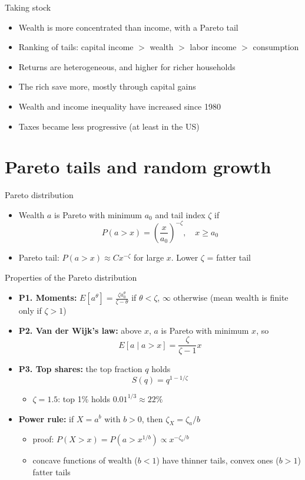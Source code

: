 \documentclass[10pt,english,10pt,handout]{beamer}
\begin{document}
\begin{frame}{Taking stock}
\begin{itemize}
\item Wealth is more concentrated than income, with a Pareto tail
\item Ranking of tails: capital income $>$ wealth $>$ labor income $>$ consumption
\item Returns are heterogeneous, and higher for richer households
\item The rich save more, mostly through capital gains
\item Wealth and income inequality have increased since 1980
\item Taxes became less progressive (at least in the US)
\end{itemize}
\end{frame}

\section[Pareto tails]{Pareto tails and random growth}

\begin{frame}{Pareto distribution}
\begin{itemize}
\item Wealth $a$ is Pareto with minimum $a_{0}$ and tail index $\zeta$ if
\[
P\left(a>x\right)=\left(\frac{x}{a_{0}}\right)^{-\zeta},\quad x\geq a_{0}
\]
\item Pareto tail: $P(a>x)\approx Cx^{-\zeta}$ for large $x$. Lower $\zeta$ = fatter tail

\end{itemize}
\end{frame}

\begin{frame}{Properties of the Pareto distribution}
\begin{itemize}
\item \textbf{P1. Moments:} $E\left[a^{\theta}\right]=\frac{\zeta a_{0}^{\theta}}{\zeta-\theta}$ if $\theta<\zeta$, $\infty$ otherwise (mean wealth is finite only if $\zeta>1$)
\item \textbf{P2. Van der Wijk's law:} above $x$, $a$ is Pareto with minimum $x$, so
\[
E\left[a\mid a>x\right]=\frac{\zeta}{\zeta-1}x
\]
\item \textbf{P3. Top shares:} the top fraction $q$ holds
\[
S(q)=q^{1-1/\zeta}
\]
\begin{itemize}
\item $\zeta=1.5$: top 1\% holds $0.01^{1/3}\approx22\%$
\end{itemize}
\item \textbf{Power rule:} if $X=a^{b}$ with $b>0$, then $\zeta_{X}=\zeta_{a}/b$
\begin{itemize}
\item proof: $P(X>x)=P(a>x^{1/b})\propto x^{-\zeta_{a}/b}$
\item concave functions of wealth ($b<1$) have thinner tails, convex ones ($b>1$) fatter tails
\end{itemize}
\end{itemize}
\end{frame}
\end{document}
